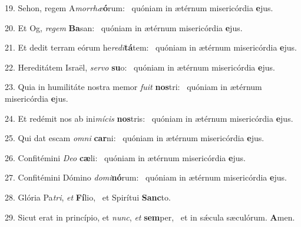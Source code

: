 19. Sehon, regem A\textit{mor}\textit{rhæ}\textbf{ó}rum: \ast\  quóniam in ætérnum misericórdia \textbf{e}jus.\

20. Et Og, \textit{re}\textit{gem} \textbf{Ba}san: \ast\  quóniam in ætérnum misericórdia \textbf{e}jus.\

21. Et dedit terram eórum he\textit{re}\textit{di}\textbf{tá}tem: \ast\  quóniam in ætérnum misericórdia \textbf{e}jus.\

22. Hereditátem Israël, \textit{ser}\textit{vo} \textbf{su}o: \ast\  quóniam in ætérnum misericórdia \textbf{e}jus.\

23. Quia in humilitáte nostra memor \textit{fu}\textit{it} \textbf{nos}tri: \ast\  quóniam in ætérnum misericórdia \textbf{e}jus.\

24. Et redémit nos ab ini\textit{mí}\textit{cis} \textbf{nos}tris: \ast\  quóniam in ætérnum misericórdia \textbf{e}jus.\

25. Qui dat escam \textit{om}\textit{ni} \textbf{car}ni: \ast\  quóniam in ætérnum misericórdia \textbf{e}jus.\

26. Confitémini \textit{De}\textit{o} \textbf{cæ}li: \ast\  quóniam in ætérnum misericórdia \textbf{e}jus.\

27. Confitémini Dómino \textit{do}\textit{mi}\textbf{nó}rum: \ast\  quóniam in ætérnum misericórdia \textbf{e}jus.\

28. Glória Pa\textit{tri}, \textit{et} \textbf{Fí}lio, \ast\  et Spirítui \textbf{Sanc}to.\

29. Sicut erat in princípio, et \textit{nunc}, \textit{et} \textbf{sem}per, \ast\  et in sǽcula sæculórum. \textbf{A}men.\

